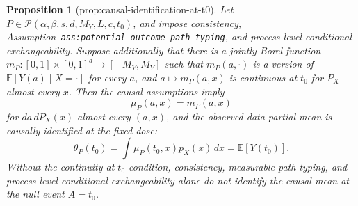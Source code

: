 \documentclass{article}
\newtheorem{proposition}{Proposition}
\begin{document}
\begin{proposition}[prop:causal-identification-at-t0]\label{prop:causal-identification-at-t0}
Let \(P\in\mathcal P(\alpha,\beta,s,d,M_Y,L,c,t_0)\), and impose consistency, Assumption~\texttt{ass:potential-outcome-path-typing}, and process-level conditional exchangeability. Suppose additionally that there is a jointly Borel function \(m_P:[0,1]\times[0,1]^d\to[-M_Y,M_Y]\) such that \(m_P(a,\cdot)\) is a version of \(\mathbb E[Y(a)\mid X=\cdot]\) for every \(a\), and \(a\mapsto m_P(a,x)\) is continuous at \(t_0\) for \(P_X\)-almost every \(x\). Then the causal assumptions imply
\[
\mu_P(a,x)=m_P(a,x)
\]
for \(da\,dP_X(x)\)-almost every \((a,x)\), and the observed-data partial mean is causally identified at the fixed dose:
\[
\theta_P(t_0)=\int\mu_P(t_0,x)p_X(x)\,dx=\mathbb E[Y(t_0)].
\]
Without the continuity-at-\(t_0\) condition, consistency, measurable path typing, and process-level conditional exchangeability alone do not identify the causal mean at the null event \(A=t_0\).
\end{proposition}
\end{document}
